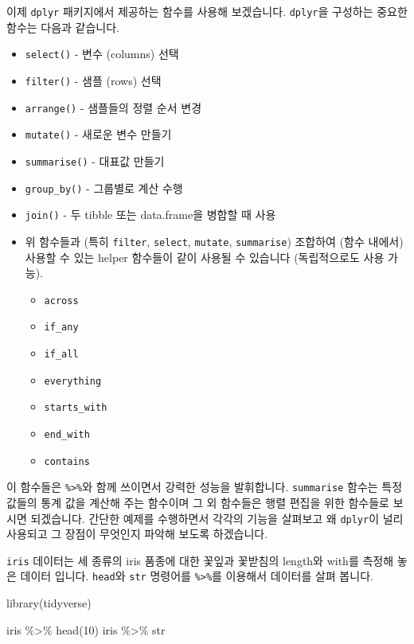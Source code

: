\documentclass[
]{book}
\newenvironment{Shaded}{\begin{snugshade}}{\end{snugshade}}
\newcommand{\DecValTok}[1]{\textcolor[rgb]{0.00,0.00,0.81}{#1}}
\newcommand{\FunctionTok}[1]{\textcolor[rgb]{0.00,0.00,0.00}{#1}}
\newcommand{\NormalTok}[1]{#1}
\newcommand{\SpecialCharTok}[1]{\textcolor[rgb]{0.00,0.00,0.00}{#1}}
\providecommand{\tightlist}{%
  \setlength{\itemsep}{0pt}\setlength{\parskip}{0pt}}
\begin{document}
이제 \texttt{dplyr} 패키지에서 제공하는 함수를 사용해 보겠습니다. \texttt{dplyr}을 구성하는 중요한 함수는 다음과 같습니다.

\begin{itemize}
\item
  \texttt{select()} - 변수 (columns) 선택
\item
  \texttt{filter()} - 샘플 (rows) 선택
\item
  \texttt{arrange()} - 샘플들의 정렬 순서 변경
\item
  \texttt{mutate()} - 새로운 변수 만들기
\item
  \texttt{summarise()} - 대표값 만들기
\item
  \texttt{group\_by()} - 그룹별로 계산 수행
\item
  \texttt{join()} - 두 tibble 또는 data.frame을 병합할 때 사용
\item
  위 함수들과 (특히 \texttt{filter}, \texttt{select}, \texttt{mutate}, \texttt{summarise}) 조합하여 (함수 내에서) 사용할 수 있는 helper 함수들이 같이 사용될 수 있습니다 (독립적으로도 사용 가능).

  \begin{itemize}
  \tightlist
  \item
    \texttt{across}
  \item
    \texttt{if\_any}
  \item
    \texttt{if\_all}
  \item
    \texttt{everything}
  \item
    \texttt{starts\_with}
  \item
    \texttt{end\_with}
  \item
    \texttt{contains}
  \end{itemize}
\end{itemize}

이 함수들은 \texttt{\%\textgreater{}\%}와 함께 쓰이면서 강력한 성능을 발휘합니다. \texttt{summarise} 함수는 특정 값들의 통계 값을 계산해 주는 함수이며 그 외 함수들은 행렬 편집을 위한 함수들로 보시면 되겠습니다. 간단한 예제를 수행하면서 각각의 기능을 살펴보고 왜 \texttt{dplyr}이 널리 사용되고 그 장점이 무엇인지 파악해 보도록 하겠습니다.

\texttt{iris} 데이터는 세 종류의 iris 품종에 대한 꽃잎과 꽃받침의 length와 with를 측정해 놓은 데이터 입니다. \texttt{head}와 \texttt{str} 명령어를 \texttt{\%\textgreater{}\%}를 이용해서 데이터를 살펴 봅니다.

\begin{Shaded}
\begin{Highlighting}[]
\FunctionTok{library}\NormalTok{(tidyverse)}

\NormalTok{iris }\SpecialCharTok{\%\textgreater{}\%} \FunctionTok{head}\NormalTok{(}\DecValTok{10}\NormalTok{)}
\NormalTok{iris }\SpecialCharTok{\%\textgreater{}\%}\NormalTok{ str}
\end{Highlighting}
\end{Shaded}
\end{document}

